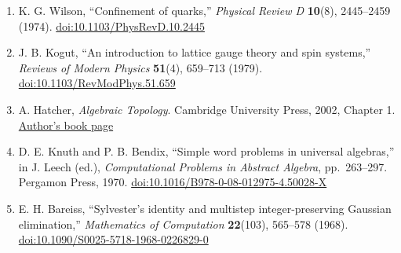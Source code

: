 \documentclass[
  11pt,
]{article}
\providecommand{\tightlist}{%
  \setlength{\itemsep}{0pt}\setlength{\parskip}{0pt}}
\begin{document}
\begin{enumerate}
\def\labelenumi{\arabic{enumi}.}
\tightlist
\item
  K. G. Wilson, ``Confinement of quarks,'' \emph{Physical Review D}
  \textbf{10}(8), 2445--2459 (1974).
  \href{https://doi.org/10.1103/PhysRevD.10.2445}{doi:10.1103/PhysRevD.10.2445}
\item
  J. B. Kogut, ``An introduction to lattice gauge theory and spin
  systems,'' \emph{Reviews of Modern Physics} \textbf{51}(4), 659--713
  (1979).
  \href{https://doi.org/10.1103/RevModPhys.51.659}{doi:10.1103/RevModPhys.51.659}
\item
  A. Hatcher, \emph{Algebraic Topology}. Cambridge University Press,
  2002, Chapter 1.
  \href{https://pi.math.cornell.edu/~hatcher/AT/ATpage.html}{Author's
  book page}
\item
  D. E. Knuth and P. B. Bendix, ``Simple word problems in universal
  algebras,'' in J. Leech (ed.), \emph{Computational Problems in
  Abstract Algebra}, pp.~263--297. Pergamon Press, 1970.
  \href{https://doi.org/10.1016/B978-0-08-012975-4.50028-X}{doi:10.1016/B978-0-08-012975-4.50028-X}
\item
  E. H. Bareiss, ``Sylvester's identity and multistep integer-preserving
  Gaussian elimination,'' \emph{Mathematics of Computation}
  \textbf{22}(103), 565--578 (1968).
  \href{https://doi.org/10.1090/S0025-5718-1968-0226829-0}{doi:10.1090/S0025-5718-1968-0226829-0}
\end{enumerate}
\end{document}
